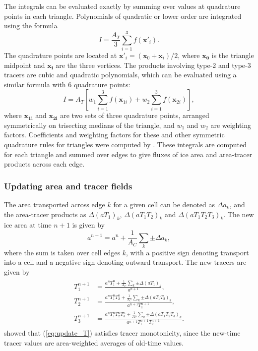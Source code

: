 The integrals can be evaluated exactly by summing over values at quadrature points in each triangle. Polynomials of quadratic or lower order are integrated using the formula
\begin{equation}
\label{eq:quadrature1}
I = \frac{{{A}_{T}}}{3}\sum\limits_{i=1}^{3}{f({{{\mathbf{{x}'}}}_{i}})}.
\end{equation}
The quadrature points are located at ${{\mathbf{{x}'}}_{i}}=({{\mathbf{x}}_{0}}+{{\mathbf{x}}_{i}})/2$, where $\mathbf{x_0}$ is the triangle midpoint and $\mathbf{x_i}$ are the three vertices. The products involving type-2 and type-3 tracers are cubic and quadratic polynomials, which can be evaluated using a similar formula with 6 quadrature points:
\begin{equation}
\label{eq:quadrature2}
I = {{A}_{T}}\left[ {{w}_{1}}\sum\limits_{i=1}^{3}{f({{\mathbf{x}}_{1i}})}+{{w}_{2}}\sum\limits_{i=1}^{3}{f({{\mathbf{x}}_{2i}})} \right],
\end{equation}
where $\mathbf{x_{1i}}$ and $\mathbf{x_{2i}}$ are two sets of three quadrature points, arranged symmetrically on trisecting medians of the triangle, and $w_1$ and $w_2$ are weighting factors. Coefficients and weighting factors for these and other symmetric quadrature rules for triangles were computed by \citet{Dunavant85}. These integrals are computed for each triangle and summed over edges to give fluxes of ice area and area-tracer products across each edge.

\subsubsection{Updating area and tracer fields}
\label{IR_update}

The area transported across edge $k$ for a given cell can be denoted as $\Delta a_k$,  and the area-tracer products as $\Delta (a T_1)_k$, $\Delta (a T_1 T_2)_k$ and $\Delta (a T_1 T_2 T_3)_k$. The new ice area at time $n+1$ is given by
\begin{equation}
\label{eq:update_a}
{{a}^{n+1}} = {{a}^{n}}+\frac{1}{{{A}_{C}}}\sum\limits_{k}{\pm \Delta {{a}_{k}}},
\end{equation}
where the sum is taken over cell edges $k$, with a positive sign denoting transport into a cell and a negative sign denoting outward transport. The new tracers are given by
\begin{align}
\begin{split}
\label{eq:update_T}
   T_{1}^{n+1} & = \frac{{{a}^{n}}T_{1}^{n}+\frac{1}{{{A}_{C}}}\sum\limits_{k}{\pm \Delta {{(a{{T}_{1}})}_{k}}}}{{{a}^{n+1}}},  \\
   T_{2}^{n+1} & = \frac{{{a}^{n}}T_{1}^{n}T_{2}^{n}+\frac{1}{{{A}_{C}}}\sum\limits_{k}{\pm \Delta {{(a{{T}_{1}}{{T}_{2}})}_{k}}}}{{{a}^{n+1}}T_{1}^{n+1}},  \\
   T_{3}^{n+1} & =\frac{{{a}^{n}}T_{1}^{n}T_{2}^{n}T_{3}^{n}+\frac{1}{{{A}_{C}}}\sum\limits_{k}{\pm \Delta {{(a{{T}_{1}}{{T}_{2}}{{T}_{3}})}_{k}}}}{{{a}^{n+1}}T_{1}^{n+1}T_{2}^{n+1}}.
\end{split}
\end{align}
\citet{Dukowicz00} showed that (\ref{eq:update_T}) satisfies tracer
monotonicity, since the new-time tracer values are area-weighted
averages of old-time values.

